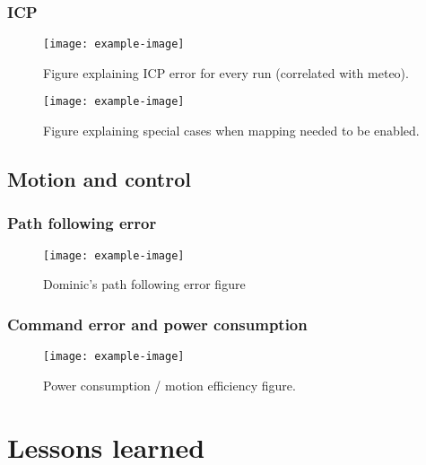 \documentclass{article}
\begin{document}
\subsubsection{ICP}
\label{sec:ICP}

\lightlipsum[1]

\begin{figure} [htpb]
	\centering
	\texttt{[image: example-image]}
	\caption{Figure explaining ICP error for every run (correlated with meteo).}
	\label{fig:icp_error}
\end{figure}

\begin{figure} [htpb]
	\centering
	\texttt{[image: example-image]}
	\caption{Figure explaining special cases when mapping needed to be enabled.}
	\label{fig:icp_failure}
\end{figure}

\subsection{Motion and control}
\label{sec:res_motion}

\lightlipsum[1]

\subsubsection{Path following error}
\label{sec:cmd_error}

\lightlipsum[1]

\begin{figure} [htpb]
	\centering
	\texttt{[image: example-image]}
	\caption{Dominic's path following error figure}
	\label{fig:pf_error}
\end{figure}

\subsubsection{Command error and power consumption}
\label{sec:cmd_error}

\lightlipsum[1]

\begin{figure} [htpb]
	\centering
	\texttt{[image: example-image]}
	\caption{Power consumption / motion efficiency figure.}
	\label{fig:moiton_power}
\end{figure}

\section{Lessons learned}
\label{sec:lessons}
\end{document}
